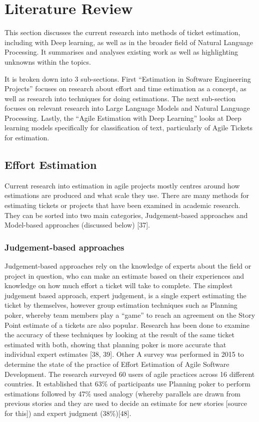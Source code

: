 \documentclass{UoYCSproject}
\begin{document}
\chapter{Literature Review}
\label{ch:literature-review}
This section discusses the current research into methods of ticket estimation, including with Deep learning, as well as in the broader field of Natural Language Processing.
It summarises and analyses existing work as well as highlighting unknowns within the topics.

It is broken down into 3 sub-sections.
First “Estimation in Software Engineering Projects” focuses on research about effort and time estimation as a concept, as well as research into techniques for doing estimations.
The next sub-section focuses on relevant research into Large Language Models and Natural Language Processing.
Lastly, the “Agile Estimation with Deep Learning” looks at Deep learning models specifically for classification of text, particularly of Agile Tickets for estimation.

\section[effort-estimation]{Effort Estimation}
\label{sec:effort-estimation}
Current research into estimation in agile projects mostly centres around how estimations are produced and what scale they use. There are many methods for estimating tickets or projects that have been examined in academic research. They can be sorted into two main categories, Judgement-based approaches and Model-based approaches (discussed below) [37].
\subsection{Judgement-based approaches}
\label{subsec:judgement-based-approaches}

Judgement-based approaches rely on the knowledge of experts about the field or project in question, who can make an estimate based on their experiences and knowledge on how much effort a ticket will take to complete.
The simplest judgement based approach, expert judgement, is a single expert estimating the ticket by themselves, however group estimation techniques such as Planning poker, whereby team members play a “game” to reach an agreement on the Story Point estimate of a tickets are also popular. Research has been done to examine the accuracy of these techniques by looking at the result of the same ticket estimated with both, showing that planning poker is more accurate that individual expert estimates [38, 39]. Other
A survey was performed in 2015 to determine the state of the practice of Effort Estimation of Agile Software
Development. The research surveyed 60 users of agile practices across 16 different countries. It established that 63\% of participants use Planning poker to perform estimations followed by 47\% used analogy (whereby parallels are drawn from previous stories and they are used to decide an estimate for new stories [source for this]) and expert judgment (38\%)[48].
\end{document}
